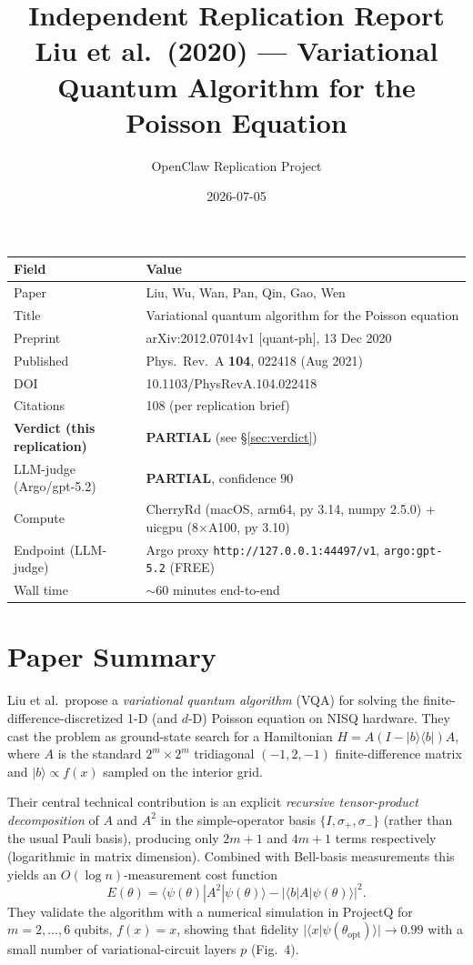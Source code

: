 \documentclass[11pt]{article}
\title{Independent Replication Report\\
\large Liu et al.\ (2020) --- Variational Quantum Algorithm for the Poisson Equation}
\author{OpenClaw Replication Project}
\date{2026-07-05}
\begin{document}
\maketitle

\begin{center}
\begin{tabular}{ll}
\toprule
\textbf{Field} & \textbf{Value} \\
\midrule
Paper & Liu, Wu, Wan, Pan, Qin, Gao, Wen \\
Title & Variational quantum algorithm for the Poisson equation \\
Preprint & arXiv:2012.07014v1 [quant-ph], 13 Dec 2020 \\
Published & Phys.\ Rev.\ A \textbf{104}, 022418 (Aug 2021) \\
DOI & 10.1103/PhysRevA.104.022418 \\
Citations & 108 (per replication brief) \\
\textbf{Verdict (this replication)} & \textbf{PARTIAL} (see \S\ref{sec:verdict}) \\
LLM-judge (Argo/gpt-5.2) & \textbf{PARTIAL}, confidence 90 \\
Compute & CherryRd (macOS, arm64, py 3.14, numpy 2.5.0) + uicgpu (8$\times$A100, py 3.10) \\
Endpoint (LLM-judge) & Argo proxy \verb|http://127.0.0.1:44497/v1|, \verb|argo:gpt-5.2| (FREE) \\
Wall time & $\sim$60 minutes end-to-end \\
\bottomrule
\end{tabular}
\end{center}

\section{Paper Summary}
Liu et al.\ propose a \emph{variational quantum algorithm} (VQA) for solving the
finite-difference-discretized 1-D (and $d$-D) Poisson equation on NISQ hardware.
They cast the problem as ground-state search for a Hamiltonian
$H = A(I - |b\rangle\langle b|)A$, where $A$ is the standard $2^m \times 2^m$
tridiagonal $(-1, 2, -1)$ finite-difference matrix and $|b\rangle \propto f(x)$
sampled on the interior grid.

Their central technical contribution is an explicit \emph{recursive
tensor-product decomposition} of $A$ and $A^2$ in the simple-operator basis
$\{I, \sigma_+, \sigma_-\}$ (rather than the usual Pauli basis), producing only
$2m+1$ and $4m+1$ terms respectively (logarithmic in matrix dimension). Combined
with Bell-basis measurements this yields an $O(\log n)$-measurement cost
function
\[
E(\theta) = \langle \psi(\theta)|A^2|\psi(\theta)\rangle
- |\langle b|A|\psi(\theta)\rangle|^2.
\]
They validate the algorithm with a numerical simulation in ProjectQ for
$m=2,\ldots,6$ qubits, $f(x)=x$, showing that fidelity
$|\langle x|\psi(\theta_{\mathrm{opt}})\rangle| \to 0.99$ with a small number
of variational-circuit layers $p$ (Fig.~4).
\end{document}
